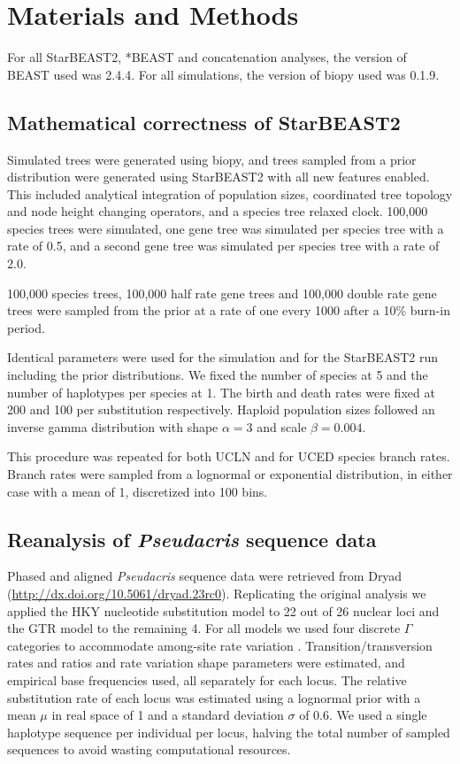 \documentclass[nogrid]{MBE}%
\begin{document}
\section{Materials and Methods}

For all StarBEAST2, *BEAST and concatenation analyses, the version of BEAST
used was 2.4.4. For all simulations, the version of biopy \citep{biopy} used
was 0.1.9.

\subsection{Mathematical correctness of StarBEAST2}

Simulated trees were generated using biopy, and trees sampled from a prior
distribution were generated using StarBEAST2 with all new features enabled.
This included analytical integration of population sizes, coordinated tree
topology and node height changing operators, and a species tree relaxed clock.
100,000 species trees were simulated, one gene tree was simulated per species
tree with a rate of 0.5, and a second gene tree was simulated per species tree
with a rate of 2.0.

100,000 species trees, 100,000 half rate gene trees and 100,000 double rate
gene trees were sampled from the prior at a rate of one every 1000 after a
10\% burn-in period.

Identical parameters were used for the simulation and for the StarBEAST2 run
including the prior distributions. We fixed the number of species at 5 and the
number of haplotypes per species at 1. The birth and death rates were fixed at
200 and 100 per substitution respectively. Haploid population sizes followed
an inverse gamma distribution with shape $\alpha = 3$ and scale $\beta =
0.004$.

This procedure was repeated for both UCLN and for UCED species branch rates.
Branch rates were sampled from a lognormal or exponential distribution, in
either case with a mean of 1, discretized into 100 bins.

\subsection{Reanalysis of \textit{Pseudacris} sequence data}

Phased and aligned \textit{Pseudacris} sequence data were retrieved from Dryad
(\url{http://dx.doi.org/10.5061/dryad.23rc0}). Replicating the original
analysis we applied the HKY nucleotide substitution model \citep{Hasegawa1985}
to 22 out of 26 nuclear loci and the GTR model \citep{Tavare1986} to the
remaining 4. For all models we used four discrete $\Gamma$ categories to
accommodate among-site rate variation \citep{Yang1994}. Transition/transversion
rates and ratios and rate variation shape parameters were estimated, and
empirical base frequencies used, all separately for each locus. The relative
substitution rate of each locus was estimated using a lognormal prior with a
mean $\mu$ in real space of 1 and a standard deviation $\sigma$ of 0.6. We
used a single haplotype sequence per individual per locus, halving the total
number of sampled sequences to avoid wasting computational resources.
\end{document}
